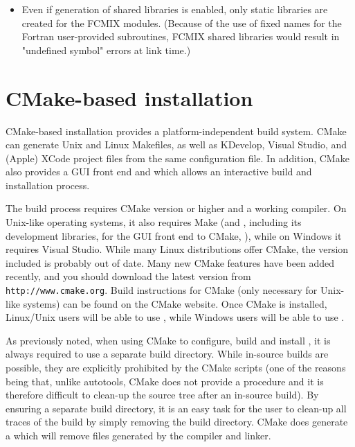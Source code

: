 \begin{itemize}
\item Even if generation of shared libraries is enabled, only static libraries
  are created for the FCMIX modules.  (Because of the use of fixed names for
  the Fortran user-provided subroutines, FCMIX shared libraries would result in
  "undefined symbol" errors at link time.)

\end{itemize}


\section{CMake-based installation}\label{s:cmake_inst}

CMake-based installation provides a platform-independent build system. CMake can generate
Unix and Linux Makefiles, as well as KDevelop, Visual Studio, and 
(Apple) XCode project files from the same configuration file.
In addition, CMake also provides a GUI front end and which allows an interactive build and
installation process.

The {\sundials} build process requires CMake version  or
higher and a working compiler.  On Unix-like operating systems, it
also requires Make (and , including its development libraries,
for the GUI front end to CMake, ), while on Windows it
requires Visual Studio.  While many Linux distributions offer CMake,
the version included is probably out of date.  Many new CMake
features have been added recently, and you should download the latest
version from {\tt http://www.cmake.org}.  Build instructions for CMake
(only necessary for Unix-like systems) can be found on the CMake website.
Once CMake is installed, Linux/Unix users will be able to use ,
while Windows users will be able to use .

As previously noted, when using CMake to configure, build and install {\sundials}, it is always
required to use a separate build directory. While in-source builds are possible, they are
explicitly prohibited by the {\sundials} CMake scripts (one of the reasons being that, unlike
autotools, CMake does not provide a  procedure and it is therefore
difficult to clean-up the source tree after an in-source build). By ensuring a separate build
directory, it is an easy task for the user to clean-up all traces of the build by simply removing
the build directory. CMake does generate a  which will remove files generated by the
compiler and linker.

